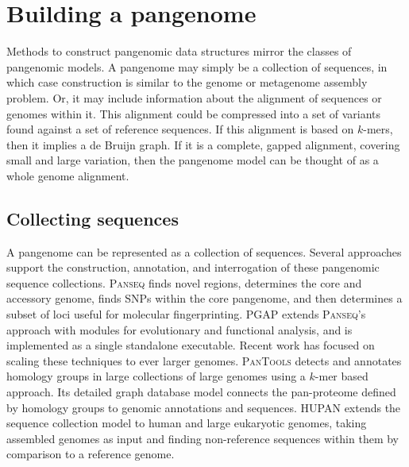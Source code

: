 \section{Building a pangenome}
\label{sec:building}

Methods to construct pangenomic data structures mirror the classes of pangenomic models.
A pangenome may simply be a collection of sequences, in which case construction is similar to the genome or metagenome assembly problem.
Or, it may include information about the alignment of sequences or genomes within it.
This alignment could be compressed into a set of variants found against a set of reference sequences.
If this alignment is based on $k$-mers, then it implies a de Bruijn graph.
If it is a complete, gapped alignment, covering small and large variation, then the pangenome model can be thought of as a whole genome alignment.

\subsection{Collecting sequences}

A pangenome can be represented as a collection of sequences.
Several approaches support the construction, annotation, and interrogation of these pangenomic sequence collections. %
\textsc{Panseq} \cite{Laing_2010} finds novel regions, determines the core and accessory genome, finds SNPs within the core pangenome, and then determines a subset of loci useful for molecular fingerprinting.
\textsc{PGAP} \cite{Zhao_2011} extends \textsc{Panseq}'s approach with modules for evolutionary and functional analysis, and is implemented as a single standalone executable.
Recent work has focused on scaling these techniques to ever larger genomes.
\textsc{PanTools} \cite{Sheikhizadeh_Anari_2018} detects and annotates homology groups in large collections of large genomes using a $k$-mer based approach.
Its detailed graph database model connects the pan-proteome defined by homology groups to genomic annotations and sequences.
\textsc{HUPAN} \citep{Duan_2019} extends the sequence collection model to human and large eukaryotic genomes, taking assembled genomes as input and finding non-reference sequences within them by comparison to a reference genome.

